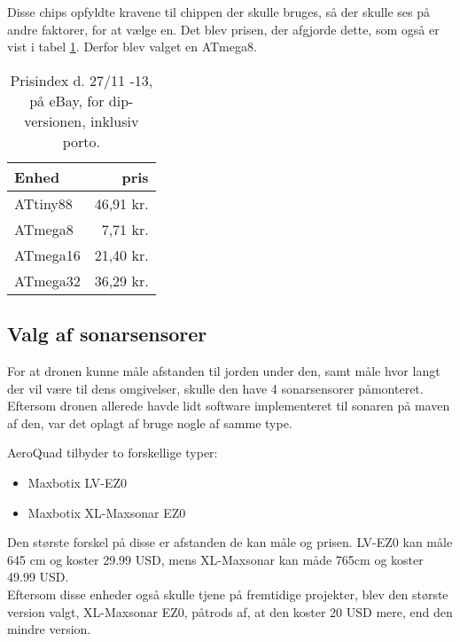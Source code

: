\documentclass[Main]{subfiles}
\begin{document}
Disse chips opfyldte kravene til chippen der skulle bruges, så der skulle ses på andre faktorer, for at vælge en. 
Det blev prisen, der afgjorde dette, som også er vist i tabel \ref{Tab:prisIndex}.
Derfor blev valget en ATmega8.

\begin{table}[H]
\centering
	\begin{tabular}{l r}\hline
	Enhed & pris \\ \hline
	ATtiny88 & 46,91 kr.\\
	ATmega8  & 7,71 kr.\\
	ATmega16 & 21,40 kr.\\
	ATmega32 & 36,29 kr. \\ \hline
	\end{tabular}
\caption{Prisindex d. 27/11 -13, på eBay, for dip-versionen, inklusiv porto.}
\label{Tab:prisIndex}
\end{table}



\subsection{Valg af sonarsensorer}
For at dronen kunne måle afstanden til jorden under den, samt måle hvor langt der vil være til dens omgivelser, skulle den have 4 sonarsensorer påmonteret.
Eftersom dronen allerede havde lidt software implementeret til sonaren på maven af den, var det oplagt af bruge nogle af samme type.


AeroQuad tilbyder to forskellige typer: 
\begin{itemize}
\item Maxbotix LV-EZ0 \cite{LV-EZ0}
\item Maxbotix XL-Maxsonar EZ0 \cite{XL-EZ0}
\end{itemize}

Den største forskel på disse er afstanden de kan måle og prisen.
LV-EZ0 kan måle 645 cm og koster 29.99 USD, mens XL-Maxsonar kan måde 765cm og koster 49.99 USD.
\\
Eftersom disse enheder også skulle tjene på fremtidige projekter, blev den største version valgt, XL-Maxsonar EZ0, påtrods af, at den koster 20 USD mere, end den mindre version.
\end{document}
